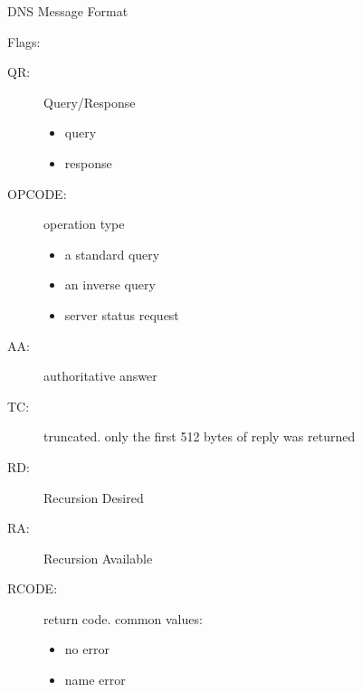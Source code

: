 \begin{frame}{DNS Message Format}
  \begin{center}
  \end{center}
  Flags:
  \begin{multicols}{2}{\scriptsize    
      \begin{description}
      \item[QR:] Query/Response
        \begin{itemize}
        \item[0:] {\scriptsize query}
        \item[1:] {\scriptsize response}
        \end{itemize}
      \item[OPCODE:] operation type
        \begin{itemize}
        \item[0] {\scriptsize a standard query}
        \item[1] {\scriptsize an inverse query}
        \item[2] {\scriptsize server status request}
        \end{itemize}
      \item[AA:] authoritative answer
      \item[TC:] truncated. only the first 512 bytes of reply was returned
      \item[RD:] Recursion Desired
      \item[RA:] Recursion Available
      \item[RCODE:] return code. common values:
        \begin{itemize}
        \item[0] {\scriptsize no error}
        \item[3] {\scriptsize name error}
        \end{itemize}
    \end{description}}
\end{multicols}
\end{frame}

\begin{frame}
  \begin{center}
  \end{center}
\end{frame}

